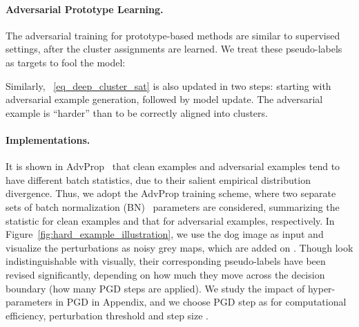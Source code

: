 \documentclass[10pt,twocolumn,letterpaper]{article}
\begin{document}
\paragraph{Adversarial Prototype Learning.}
The adversarial training for prototype-based methods are similar to supervised settings, after the cluster assignments  are learned. We treat these pseudo-labels as targets to fool the model:\vspace{-2mm}

Similarly, ~\eqref{eq_deep_cluster_sat} is also updated in two steps: starting with adversarial example generation, followed by model update. The adversarial example  is ``harder'' than  to be correctly aligned into clusters. 

\paragraph{Implementations.} It is shown in AdvProp~\cite{xie2020adversarial} that clean examples and adversarial examples tend to have different batch statistics, due to their salient empirical distribution divergence. Thus, we adopt the AdvProp training scheme, where two separate sets of batch normalization (BN)~\cite{ioffe2015batch} parameters are considered, summarizing the statistic for clean examples and that for adversarial examples, respectively. In Figure~\ref{fig:hard_example_illustration}, we use the dog image as input and visualize the perturbations as noisy grey maps, which are added on . Though  look indistinguishable with  visually, their corresponding pseudo-labels have been revised significantly, depending on how much they move across the decision boundary (\ie how many PGD steps are applied). We study the impact of hyper-parameters in PGD in Appendix, and we choose PGD step as  for computational efficiency, perturbation threshold  and step size .  
\end{document}
